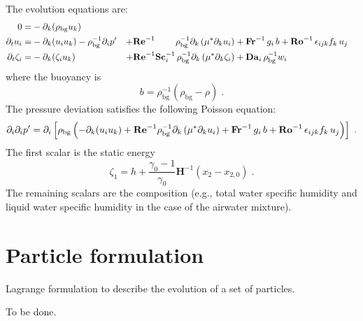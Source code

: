 The evolution equations are:
\begin{subequations}
  \begin{align}
    0                 =& -\partial_k(\rho_\mathrm{bg}u_k)   & \\
    \partial_t  u_i   =& -\partial_k ( u_i u_k )-\rho_\mathrm{bg}^{-1}\partial_i p' &
    +\mathrm{\bf Re}^{-1}\qquad\;\rho_\mathrm{bg}^{-1}\partial_k \left( \mu^{*} \partial_k u_i\right) & +\mathrm{\bf Fr}^{-1}\, g_i\,b+\mathrm{\bf Ro}^{-1}\,\epsilon_{ijk} f_k\,u_j  \\
    \partial_t\zeta_i =& -\partial_k (\zeta_i u_k) &
    + \mathrm{\bf Re}^{-1}\mathrm{\bf Sc}_i^{-1}\, \rho_\mathrm{bg}^{-1}\partial_k \left( \mu^{*}\partial_k\zeta_i\right) &+ \mathrm{\bf Da}_i\,\rho_\mathrm{bg}^{-1}w_i
  \end{align}
\end{subequations}
where the buoyancy is
\begin{equation}
  b=\rho_\mathrm{bg}^{-1}(\rho_\mathrm{bg}-\rho) \;.
\end{equation}
The pressure deviation satisfies the following Poisson equation:
\begin{equation}
  \partial_i\partial_ip'=\partial_i\left[\rho_\mathrm{bg}\left(
  -\partial_k ( u_i u_k )+\mathrm{\bf Re}^{-1}\rho_\mathrm{bg}^{-1}\partial_k \left( \mu^{*} \partial_k u_i\right) +\mathrm{\bf Fr}^{-1}\, g_i\,b+\mathrm{\bf Ro}^{-1}\,\epsilon_{ijk} f_k\,u_j
  \right)\right]\;.
\end{equation}
The first scalar is the static energy
\begin{equation}
  \zeta_1 = h + \frac{\gamma_0-1}{\gamma_0}\mathbf{H}^{-1}(x_2-x_{2,0}) \;.
\end{equation}
The remaining scalars are the composition (e.g., total water specific humidity and liquid water specific humidity in the case of the airwater mixture).

\section{Particle formulation}

Lagrange formulation to describe the evolution of a set of particles.

To be done.